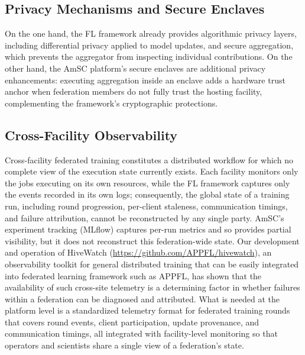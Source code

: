 \documentclass[conference]{IEEEtran}
\begin{document}
\subsection{Privacy Mechanisms and Secure Enclaves}
On the one hand, the FL framework already provides algorithmic privacy layers, including differential privacy applied to model updates, and secure aggregation, which prevents the aggregator from inspecting individual contributions. On the other hand, the AmSC platform's secure enclaves are additional privacy enhancements: executing aggregation inside an enclave adds a hardware trust anchor when federation members do not fully trust the hosting facility, complementing the framework's cryptographic protections.

\subsection{Cross-Facility Observability}
Cross-facility federated training constitutes a distributed workflow for which no complete view of the execution state currently exists. Each facility monitors only the jobs executing on its own resources, while the FL framework captures only the events recorded in its own logs; consequently, the global state of a training run, including round progression, per-client staleness, communication timings, and failure attribution, cannot be reconstructed by any single party. AmSC's experiment tracking (MLflow) captures per-run metrics and so provides partial visibility, but it does not reconstruct this federation-wide state. Our development and operation of HiveWatch (\href{https://github.com/APPFL/hivewatch}{https://github.com/APPFL/hivewatch}), an observability toolkit for general distributed training that can be easily integrated into federated learning framework such as APPFL, has shown that the availability of such cross-site telemetry is a determining factor in whether failures within a federation can be diagnosed and attributed. What is needed at the platform level is a standardized telemetry format for federated training rounds that covers round events, client participation, update provenance, and communication timings, all integrated with facility-level monitoring so that operators and scientists share a single view of a federation's state.
\end{document}

